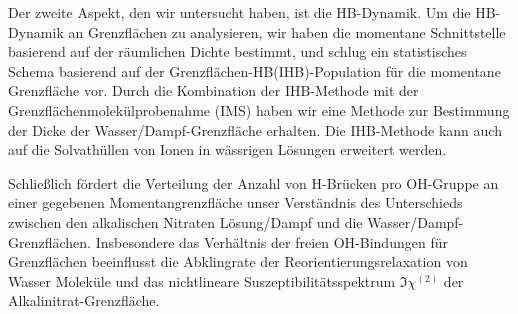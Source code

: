 \documentclass[
11pt, %
ngerman,
english, %
singlespacing, %
headsepline, %
]{MastersDoctoralThesis} %
\begin{document}
{\begin{extraAbstract}
Der zweite Aspekt, den wir untersucht haben, ist die HB-Dynamik.
Um die HB-Dynamik an Grenzflächen zu analysieren,
wir haben die momentane Schnittstelle basierend auf der räumlichen Dichte bestimmt,
und schlug ein statistisches Schema basierend auf der Grenzflächen-HB(IHB)-Population für die momentane Grenzfläche vor.
Durch die Kombination der IHB-Methode mit der Grenzflächenmolekülprobenahme (IMS) haben wir eine Methode zur Bestimmung der Dicke der Wasser/Dampf-Grenzfläche erhalten.
Die IHB-Methode kann auch auf die Solvathüllen von Ionen in wässrigen Lösungen erweitert werden.

Schließlich fördert die Verteilung der Anzahl von H-Brücken pro OH-Gruppe an einer gegebenen Momentangrenzfläche unser Verständnis des Unterschieds zwischen den alkalischen Nitraten
Lösung/Dampf und die Wasser/Dampf-Grenzflächen. Insbesondere das Verhältnis der freien OH-Bindungen für Grenzflächen beeinflusst die Abklingrate der Reorientierungsrelaxation von Wasser
Moleküle und das nichtlineare Suszeptibilitätsspektrum $\Im \chi^{(2)}$ der Alkalinitrat-Grenzfläche.
\end{extraAbstract}
}
\end{document}

